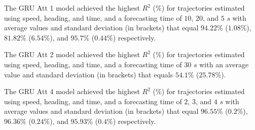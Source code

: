 \begin{table}[!ht]
	\centering
	\caption{The average $R^{2}$ (\%), with standard deviation in brackets, across $k$-fold validation datasets for the trajectories in the $k$-fold testing datasets estimated using speed, heading, and time, different RNN models, and forecasting times.}
	\label{tab:best_speed_actual_dir_R2}
\end{table}

The GRU Att 1 model achieved the highest $R^{2}$ (\%) for trajectories estimated using speed, heading, and time, and a forecasting time of $10$, $20$, and $5$ $s$ with average values and standard deviation (in brackets) that equal $94.22$\% ($1.08$\%), $81.82$\% ($6.54$\%), and $95.7$\% ($0.44$\%) respectively.

The GRU Att 2 model achieved the highest $R^{2}$ (\%) for trajectories estimated using speed, heading, and time, and a forecasting time of $30$ $s$ with an average value and standard deviation (in brackets) that equals $54.1$\% ($25.78$\%).

The GRU Att 4 model achieved the highest $R^{2}$ (\%) for trajectories estimated using speed, heading, and time, and a forecasting time of $2$, $3$, and $4$ $s$ with average values and standard deviation (in brackets) that equal $96.55$\% ($0.2$\%), $96.36$\% ($0.24$\%), and $95.93$\% ($0.4$\%) respectively.

